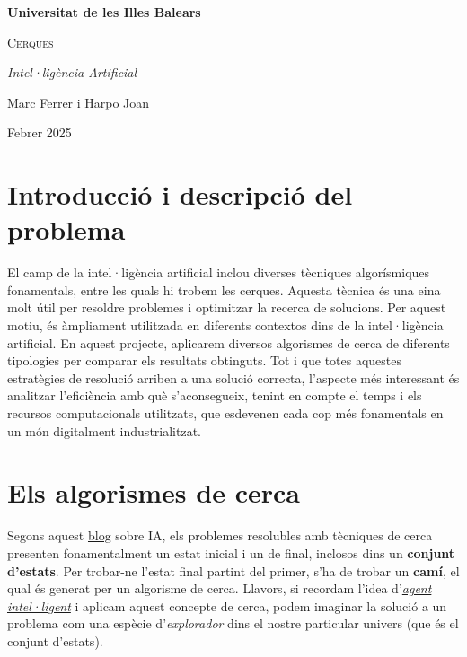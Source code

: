 \documentclass{article}
\begin{document}
\begin{titlepage}
    \centering
    {\bfseries\large Universitat de les Illes Balears \par 
    \vspace{1cm}}
    {\scshape\Huge Cerques \par}
    \vspace{1cm}
    {\itshape\Large Intel·ligència Artificial \par}
    \vfill
    {\Large Marc Ferrer i Harpo Joan\par}
\vfill
{\Large Febrer 2025 \par}
\vfill
\end{titlepage}

\newpage

\tableofcontents

\newpage

\section{Introducció i descripció del problema}
El camp de la intel·ligència artificial inclou diverses tècniques algorísmiques fonamentals, entre les quals hi trobem les cerques. Aquesta tècnica és una eina molt útil per resoldre problemes i optimitzar la recerca de solucions. Per aquest motiu, és àmpliament utilitzada en diferents contextos dins de la intel·ligència artificial. En aquest projecte, aplicarem diversos algorismes de cerca de diferents tipologies per comparar els resultats obtinguts. Tot i que totes aquestes estratègies de resolució arriben a una solució correcta, l’aspecte més interessant és analitzar l’eficiència amb què s'aconsegueix, tenint en compte el temps i els recursos computacionals utilitzats, que esdevenen cada cop més fonamentals en un món digitalment industrialitzat.

\section{Els algorismes de cerca}
Segons aquest \href{https://www.geeksforgeeks.org/search-algorithms-in-ai/}{blog} sobre IA, els problemes resolubles amb tècniques de cerca presenten fonamentalment un estat inicial i un de final, inclosos dins un \textbf{conjunt d'estats}. Per trobar-ne l'estat final partint del primer, s'ha de trobar un \textbf{camí}, el qual és generat per un algorisme de cerca. Llavors, si recordam l'idea d'\href{https://en.wikipedia.org/wiki/Intelligent_agent}{\textit{agent intel·ligent}} i aplicam aquest concepte de cerca, podem imaginar la solució a un problema com una espècie d'\textit{explorador} dins el nostre particular univers (que és el conjunt d'estats).
\end{document}
